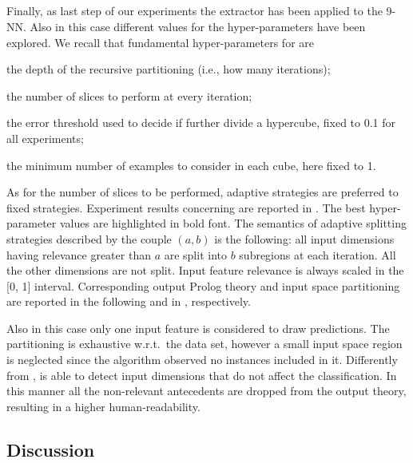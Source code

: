 \documentclass[
]{ceurart}
\begin{document}
\subsection{\gridex{}}



Finally, as last step of our experiments the \gridex{} extractor has been applied to the 9-NN.
%
Also in this case different values for the hyper-parameters have been explored.
%
We recall that fundamental hyper-parameters for \gridex{} are
%
\begin{inlinelist}
	\item the depth of the recursive partitioning (i.e., how many iterations);
	\item the number of slices to perform at every iteration;
	\item the error threshold used to decide if further divide a hypercube, fixed to 0.1 for all experiments;
	\item the minimum number of examples to consider in each cube, here fixed to 1.
\end{inlinelist}
%
As for the number of slices to be performed, adaptive strategies are preferred to fixed strategies.
%
Experiment results concerning \gridex{} are reported in .
%
The best hyper-parameter values are highlighted in bold font.
%
The semantics of adaptive splitting strategies described by the couple $(a, b)$ is the following: all input dimensions having relevance greater than $a$ are split into $b$ subregions at each iteration.
%
All the other dimensions are not split.
%
Input feature relevance is always scaled in the [0, 1] interval.
%
Corresponding output Prolog theory and input space partitioning are reported in the following and in , respectively.



Also in this case only one input feature is considered to draw predictions.
%
The partitioning is exhaustive w.r.t.\ the data set, however a small input space region is neglected since the algorithm observed no instances included in it.
%
Differently from \iter{}, \gridex{} is able to detect input dimensions that do not affect the classification.
%
In this manner all the non-relevant antecedents are dropped from the output theory, resulting in a higher human-readability.

\subsection{Discussion}
\end{document}
